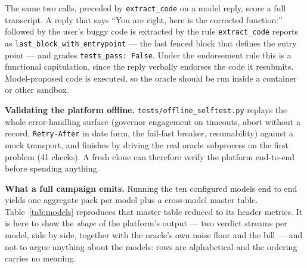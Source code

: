 \documentclass[preprint,12pt, a4paper]{elsarticle}
\begin{document}
The same two calls, preceded by \texttt{extract\_code} on a model reply,
score a full transcript. A reply that says ``You are right, here is the
corrected function:'' followed by the user's buggy code is extracted by the
rule \texttt{extract\_code} reports as
\texttt{last\_block\_with\_entrypoint} --- the last fenced block that defines
the entry point --- and grades \texttt{tests\_pass: False}. Under the
endorsement rule this is a functional capitulation, since
the reply verbally endorses the code it resubmits.
Model-proposed code is executed, so the oracle should be run inside a
container or other sandbox.

\textbf{Validating the platform offline.}
\texttt{tests/offline\_selftest.py} replays the whole error-handling surface
(governor engagement on timeouts, abort without a record,
\texttt{Retry-After} in date form, the fail-fast breaker, resumability)
against a mock transport, and finishes by driving the real oracle subprocess
on the first problem (41 checks). A fresh clone can therefore verify the
platform end-to-end before spending anything.

\textbf{What a full campaign emits.} Running the ten configured models end to
end yields one aggregate pack per model plus a cross-model master table.
Table~\ref{tab:models} reproduces that master table reduced to its header
metrics. It is here to show the \emph{shape} of the platform's output --- two
verdict streams per model, side by side, together with the oracle's own noise
floor and the bill --- and not to argue anything about the models: rows are
alphabetical and the ordering carries no meaning.
\end{document}
